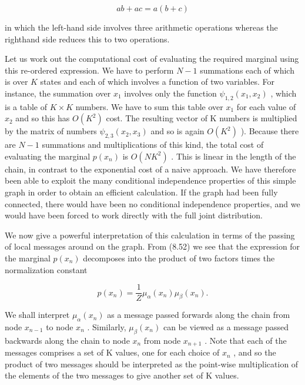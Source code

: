 \documentclass[
  10
]{article}
\begin{document}
\[
a b + a c = a (b + c)\tag{8.53}
\]

in which the left-hand side involves three arithmetic operations whereas
the righthand side reduces this to two operations.

Let us work out the computational cost of evaluating the required
marginal using this re-ordered expression. We have to perform \(N - 1\)
summations each of which is over \(K\) states and each of which involves
a function of two variables. For instance, the summation over
\(x _ { 1 }\) involves only the function
\(\psi _ { 1 , 2 } ( x _ { 1 } , x _ { 2 } )\) , which is a table of
\(K \times K\) numbers. We have to sum this table over \(x _ { 1 }\) for
each value of \(x _ { 2 }\) and so this has \(O ( K ^ { 2 } )\) cost.
The resulting vector of K numbers is multiplied by the matrix of numbers
\(\psi _ { 2 , 3 } ( x _ { 2 } , x _ { 3 } )\) and so is again
\(O ( K ^ { 2 } )\) ). Because there are \(N - 1\) summations and
multiplications of this kind, the total cost of evaluating the marginal
\(p ( x _ { n } )\) is \(O ( N K ^ { 2 } )\) . This is linear in the
length of the chain, in contrast to the exponential cost of a naive
approach. We have therefore been able to exploit the many conditional
independence properties of this simple graph in order to obtain an
efficient calculation. If the graph had been fully connected, there
would have been no conditional independence properties, and we would
have been forced to work directly with the full joint distribution.

We now give a powerful interpretation of this calculation in terms of
the passing of local messages around on the graph. From (8.52) we see
that the expression for the marginal \(p ( x _ { n } )\) decomposes into
the product of two factors times the normalization constant

\[
p (x _ {n}) = \frac {1}{Z} \mu_ {\alpha} (x _ {n}) \mu_ {\beta} (x _ {n}).\tag{8.54}
\]

We shall interpret \(\mu _ { \alpha } ( x _ { n } )\) as a message
passed forwards along the chain from node \(x _ { n - 1 }\) to node
\(x _ { n }\) . Similarly, \(\mu _ { \beta } ( x _ { n } )\) can be
viewed as a message passed backwards along the chain to node
\(x _ { n }\) from node \(x _ { n + 1 }\) . Note that each of the
messages comprises a set of K values, one for each choice of
\(x _ { n }\) , and so the product of two messages should be interpreted
as the point-wise multiplication of the elements of the two messages to
give another set of K values.
\end{document}
